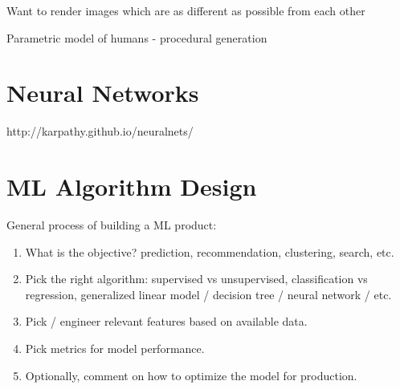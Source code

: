 Want to render images which are as different as possible from each other

Parametric model of humans - procedural generation

\section{Neural Networks}

http://karpathy.github.io/neuralnets/


\section{ML Algorithm Design}

General process of building a ML product:

\begin{enumerate}
\item What is the objective? prediction, recommendation, clustering, search, etc.
\item Pick the right algorithm: supervised vs unsupervised, classification vs regression, generalized linear model / decision tree / neural network / etc.
\item Pick / engineer relevant features based on available data.
\item Pick metrics for model performance.
\item Optionally, comment on how to optimize the model for production.
\end{enumerate}
